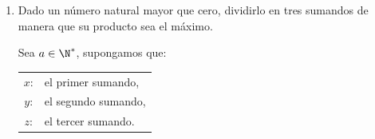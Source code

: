 \documentclass[a4,11pt]{aleph-examen}
\begin{document}
\begin{preguntas}
\begin{respuesta}
\begin{respuesta}
\begin{respuesta}
\begin{enumerate}
\begin{respuesta}
    Se utilizará la siguiente notación
    \begin{itemize}
        \item $(x,y):$ punto sobre la superficie
        \item $d(x,y):$ distancia del punto $(x,y)$ al origen, en unidades de longitud
        \item $D(x,y):$ cuadrado de la distancia del punto $(x,y)$ al origen.
        
    \end{itemize}
   Se sabe que la distancia de un punto al origen viene definida por $d=\sqrt{x^2+y^2+z^2}$, como $d \geq 0$ entonces la distancia será mínima cuando $x^2+y^2+z^2$ sea mínimo. Finalmente se definen las funciones
   \[
        \funcion{D}{\R^3}{\R}{(x,y,z)}{x^2+y^2+z^2}
   \]
   y
   \[
         \funcion{g}{\R^* \times \R^* \times \R }{\R}{\R}{z-\dfrac{1}{xy}.}
   \]
   Con esto se debe optimizar, 
   \[
        \begin{cases}
            \max D(x,y,z)\\
            \text{sujeto  a:}\\
            g(x,y,z)=0.
        \end {cases}
    \]
   Por el ejercicio 1 de la hoja de ejercicios 9 se sabe que la distancia es mínima en los puntos $(1,1,1)$, $(1,-1,-1)$, $(-1,-1,1)$ y $(-1,1,-1)$ y será $d=\sqrt{3}$.
   
   Otra forma de optimizar este problema se detalla en el ejercicio 11 de la hoja de ejercicios 8.

\end{respuesta}


    \item 
    Dado un número natural mayor que cero, dividirlo en tres sumandos de manera que su producto sea el máximo.

\begin{respuesta}
    Sea $a\in\N^{*}$, supongamos que:
    \begin{table}[h]
        \begin{tabular}{cl}
            $x$: &el primer sumando,\\
            $y$: &el segundo sumando,\\
            $z$: &el tercer sumando.
        \end{tabular}
    \end{table}
    

\end{respuesta}
\end{enumerate}
\end{respuesta}
\end{respuesta}
\end{respuesta}
\end{preguntas}
\end{document}
